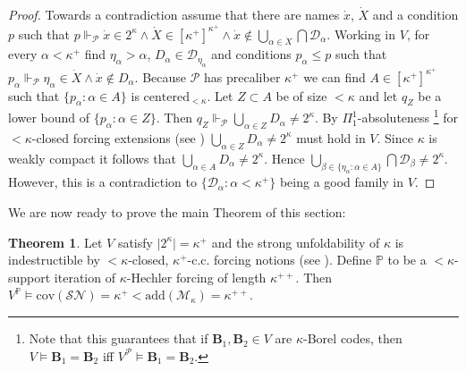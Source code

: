 \documentclass[12pt,a4paper]{scrartcl}
\theoremstyle{definition}
\newtheorem{theorem}[definition]{Theorem}
\numberwithin{equation}{section}
\begin{document}
\begin{proof}
Towards a contradiction assume that there are names $\dot{x}$, $\dot{X}$ and a condition $p$ such that $p \Vdash_{\mathcal{P}} \dot{x} \in 2^\kappa \land \dot{X} \in [\kappa^+]^{\kappa^+} \land \dot{x} \notin \bigcup_{\alpha \in \dot{X}} \bigcap \mathcal{D}_\alpha$.  Working in $V$, for every $\alpha < \kappa^+$ find $\eta_\alpha > \alpha$, $D_\alpha \in \mathcal{D}_{\eta_\alpha}$ and conditions $p_\alpha \leq p$ such that $p_\alpha \Vdash_{\mathcal{P}} \eta_\alpha \in \dot{X} \land \dot{x} \notin D_\alpha$. Because $\mathcal{P}$ has precaliber $\kappa^+$ we can find $A \in [\kappa^+]^{\kappa^+}$ such that $\{p_\alpha \colon \alpha \in A\}$ is $\text{centered}_{<\kappa}$. Let $Z \subset A$ be of size $<\kappa$ and let $q_Z$ be a lower bound of $\{p_\alpha \colon \alpha \in Z\}$. Then $q_Z \Vdash_{\mathcal{P}} \bigcup_{\alpha \in Z} D_\alpha \neq 2^\kappa$. By $\Pi_1^1$-absoluteness \footnote{Note that this guarantees that if $\mathbf{B}_1, \mathbf{B}_2 \in V$ are $\kappa$-Borel codes, then $V \vDash \mathbf{B}_1 =\mathbf{B}_2$ iff $V^{\mathcal{P}} \vDash \mathbf{B}_1 =\mathbf{B}_2$.} for ${<}\kappa$-closed forcing extensions (see \citep{Friedman}) $\bigcup_{\alpha \in Z} D_\alpha \neq 2^\kappa$ must hold in $V$. Since $\kappa$ is weakly compact it follows that $\bigcup_{\alpha \in A} D_\alpha \neq 2^\kappa$. Hence $\bigcup_{\beta \in \{ \eta_\alpha \colon \alpha \in A\}} \bigcap \mathcal{D}_\beta \neq 2^\kappa$. However, this is a contradiction to $\{\mathcal{D}_\alpha \colon \alpha < \kappa^+\}$ being a good family in $V$.
\end{proof}

We are now ready to prove the main Theorem of this section:

\begin{theorem}
Let $V$ satisfy $\vert 2^\kappa\vert =\kappa^+$ and the strong unfoldability of $\kappa$ is indestructible by ${<}\kappa$-closed, $\kappa^+$-c.c. forcing notions (see \cite{Johnstone}). Define $\mathbb{P}$ to be a ${<}\kappa$-support iteration of $\kappa$-Hechler forcing of length $\kappa^{++}$. Then $V^{\mathbb{P}} \vDash \text{cov}(\mathcal{SN})= \kappa^+ <\text{add}(\mathcal{M}_\kappa)=\kappa^{++}$.
\end{theorem}
\end{document}
